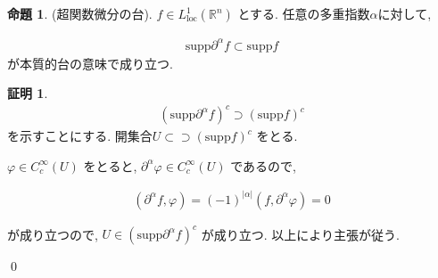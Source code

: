 \documentclass[10pt, fleqn, label-section=none]{bxjsarticle}
\theoremstyle{definition}
\newtheorem{prop}[dfn]{命題}
\newtheorem*{pf*}{証明}
\newcommand{\abs}[1]{\left|#1\right|}
\newcommand{\supp}{\textrm{supp}}
\renewcommand{\;}{\, ; \,}
\begin{document}
\begin{prop}(超関数微分の台). $f \in L_{\textrm{loc}}^1(\mathbb R^n)$ とする. 任意の多重指数$\alpha$に対して, 

\begin{align*} \supp \partial^\alpha f \subset \supp  f \end{align*}
が本質的台の意味で成り立つ. 

\end{prop}
\begin{pf*}

\begin{align*} (\supp \partial^\alpha f)^c \supset (\supp  f) ^c   \end{align*}
を示すことにする.  開集合$U \subset \supset (\supp  f) ^c  $ をとる. 

$\varphi \in C_c^\infty (U )$ をとると, $\partial ^\alpha \varphi  \in C_c^\infty (U) $ であるので, 

\begin{align*} (\partial^\alpha f,  \varphi) = (-1)^{\abs \alpha } (f, \partial ^\alpha \varphi ) = 0  \end{align*}

が成り立つので, $U \in (\supp \partial^\alpha f)^c$ が成り立つ. 以上により主張が従う. 



\qed
\end{pf*}
\end{document}
